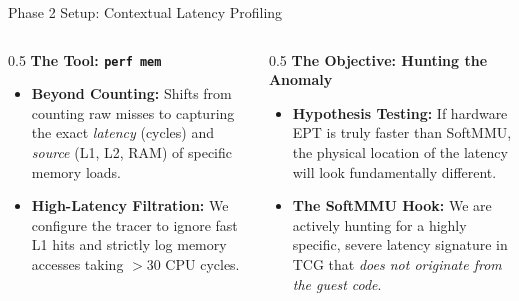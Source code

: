 \documentclass[aspectratio=169]{beamer} %
\begin{document}
    \begin{frame}{Phase 2 Setup: Contextual Latency Profiling}
      \begin{columns}[T]
          \begin{column}{0.5\textwidth}
              \textbf{The Tool: \texttt{perf mem}}
              \vspace{0.2cm}
              \begin{itemize}
                  \item \textbf{Beyond Counting:} Shifts from counting raw misses to capturing the exact \textit{latency} (cycles) and \textit{source} (L1, L2, RAM) of specific memory loads.
                  \item \textbf{High-Latency Filtration:} We configure the tracer to ignore fast L1 hits and strictly log memory accesses taking $>30$ CPU cycles.
              \end{itemize}
          \end{column}

          \begin{column}{0.5\textwidth}
              \textbf{The Objective: Hunting the Anomaly}
              \vspace{0.2cm}
              \begin{itemize}
                  \item \textbf{Hypothesis Testing:} If hardware EPT is truly faster than SoftMMU, the physical location of the latency will look fundamentally different.
                  \item \textcolor{HighlightCyan}{\textbf{The SoftMMU Hook:}} We are actively hunting for a highly specific, severe latency signature in TCG that \textit{does not originate from the guest code}.
              \end{itemize}
          \end{column}
      \end{columns}
  \end{frame}
\end{document}

